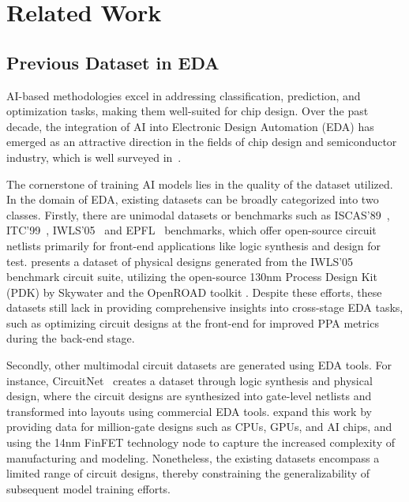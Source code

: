 \section{Related Work} \label{Sec:Related}
\subsection{Previous Dataset in EDA}
AI-based methodologies excel in addressing classification, prediction, and optimization tasks, making them well-suited for chip design. Over the past decade, the integration of AI into Electronic Design Automation (EDA) has emerged as an attractive direction in the fields of chip design and semiconductor industry, which is well surveyed in~\cite{huang2021machine, chen2024dawn}. 

The cornerstone of training AI models lies in the quality of the dataset utilized. In the domain of EDA, existing datasets can be broadly categorized into two classes. Firstly, there are unimodal datasets or benchmarks such as ISCAS'89~\cite{ISCAS89}, ITC'99~\cite{ITC99}, IWLS'05~\cite{IWLS05} and EPFL~\cite{EPFLBenchmarks} benchmarks, which offer open-source circuit netlists primarily for front-end applications like logic synthesis and design for test. \cite{shrestha2024edaschema} presents a dataset of physical designs generated from the IWLS'05 benchmark circuit suite, utilizing the open-source 130nm Process Design Kit (PDK) by Skywater and the OpenROAD toolkit \cite{ajayi2019openroad}. 
Despite these efforts, these datasets still lack in providing comprehensive insights into cross-stage EDA tasks, such as optimizing circuit designs at the front-end for improved PPA metrics during the back-end stage.

Secondly, other multimodal circuit datasets are generated using EDA tools. For instance, CircuitNet~\cite{chai2022circuitnet, jiang2024circuitnet2} creates a dataset through logic synthesis and physical design, where the circuit designs are synthesized into gate-level netlists and transformed into layouts using commercial EDA tools. \cite{jiang2024circuitnet2} expand this work by providing data for million-gate designs such as CPUs, GPUs, and AI chips, and using the 14nm FinFET technology node to capture the increased complexity of manufacturing and modeling. Nonetheless, the existing datasets encompass a limited range of circuit designs, thereby constraining the generalizability of subsequent model training efforts. 

